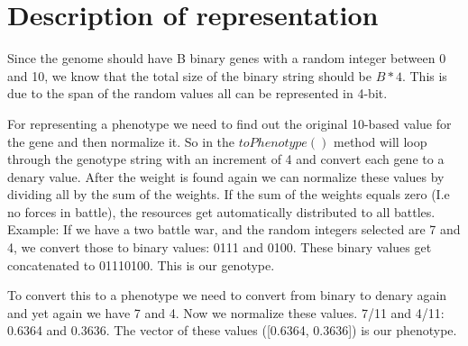 \section{Description of representation}

Since the genome should have B binary genes with a random integer between 0 and 10, we know that 
the total size of the binary string should be $B*4$. This is due to the span of the random values all
can be represented in 4-bit. 

For representing a phenotype we need to find out the original 10-based value for the gene and then
normalize it. So in the $toPhenotype()$ method will loop through the genotype string with an increment
of 4 and convert each gene to a denary value. After the weight is found again we can normalize these
values by dividing all by the sum of the weights. If the sum of the weights equals zero (I.e no forces
in battle), the resources get automatically distributed to all battles. \\

Example: If we have a two battle war, and the random integers selected are 7 and 4, we convert those to 
binary values: 0111 and 0100. These binary values get concatenated to 01110100. This is our genotype.

To convert this to a phenotype we need to convert from binary to denary again and yet again we have 7 
and 4. Now we normalize these values. 7/11 and 4/11: 0.6364 and 0.3636. The vector of these values
([0.6364, 0.3636]) is our phenotype.
